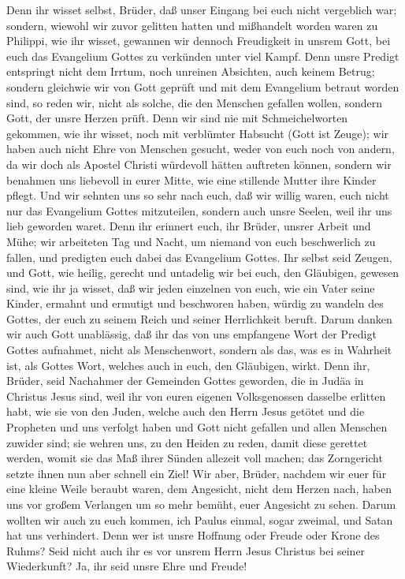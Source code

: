  Denn ihr wisset selbst, Brüder, daß unser Eingang bei
euch nicht vergeblich war;  sondern, wiewohl wir zuvor
gelitten hatten und mißhandelt worden waren zu Philippi, wie ihr wisset,
gewannen wir dennoch Freudigkeit in unsrem Gott, bei euch das Evangelium
Gottes zu verkünden unter viel Kampf.  Denn unsre Predigt
entspringt nicht dem Irrtum, noch unreinen Absichten, auch keinem
Betrug;  sondern gleichwie wir von Gott geprüft und mit
dem Evangelium betraut worden sind, so reden wir, nicht als solche, die
den Menschen gefallen wollen, sondern Gott, der unsre Herzen prüft.
 Denn wir sind nie mit Schmeichelworten gekommen, wie ihr
wisset, noch mit verblümter Habsucht (Gott ist Zeuge); 
wir haben auch nicht Ehre von Menschen gesucht, weder von euch noch von
andern,  da wir doch als Apostel Christi würdevoll hätten
auftreten können, sondern wir benahmen uns liebevoll in eurer Mitte, wie
eine stillende Mutter ihre Kinder pflegt.  Und wir sehnten
uns so sehr nach euch, daß wir willig waren, euch nicht nur das
Evangelium Gottes mitzuteilen, sondern auch unsre Seelen, weil ihr uns
lieb geworden waret.  Denn ihr erinnert euch, ihr Brüder,
unsrer Arbeit und Mühe; wir arbeiteten Tag und Nacht, um niemand von
euch beschwerlich zu fallen, und predigten euch dabei das Evangelium
Gottes.  Ihr selbst seid Zeugen, und Gott, wie heilig,
gerecht und untadelig wir bei euch, den Gläubigen, gewesen sind,
 wie ihr ja wisset, daß wir jeden einzelnen von euch, wie
ein Vater seine Kinder, ermahnt und ermutigt und beschworen haben,
 würdig zu wandeln des Gottes, der euch zu seinem Reich
und seiner Herrlichkeit beruft.  Darum danken wir auch
Gott unablässig, daß ihr das von uns empfangene Wort der Predigt Gottes
aufnahmet, nicht als Menschenwort, sondern als das, was es in Wahrheit
ist, als Gottes Wort, welches auch in euch, den Gläubigen, wirkt.
 Denn ihr, Brüder, seid Nachahmer der Gemeinden Gottes
geworden, die in Judäa in Christus Jesus sind, weil ihr von euren
eigenen Volksgenossen dasselbe erlitten habt, wie sie von den Juden,
 welche auch den Herrn Jesus getötet und die Propheten
und uns verfolgt haben und Gott nicht gefallen und allen Menschen
zuwider sind;  sie wehren uns, zu den Heiden zu reden,
damit diese gerettet werden, womit sie das Maß ihrer Sünden allezeit
voll machen; das Zorngericht setzte ihnen nun aber schnell ein Ziel!
 Wir aber, Brüder, nachdem wir euer für eine kleine Weile
beraubt waren, dem Angesicht, nicht dem Herzen nach, haben uns vor
großem Verlangen um so mehr bemüht, euer Angesicht zu sehen.
 Darum wollten wir auch zu euch kommen, ich Paulus
einmal, sogar zweimal, und Satan hat uns verhindert. 
Denn wer ist unsre Hoffnung oder Freude oder Krone des Ruhms? Seid nicht
auch ihr es vor unsrem Herrn Jesus Christus bei seiner Wiederkunft?
 Ja, ihr seid unsre Ehre und Freude!


